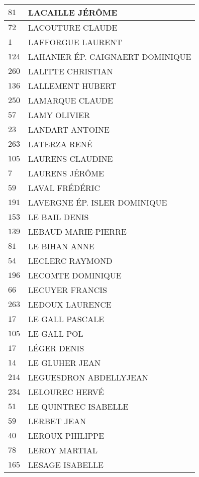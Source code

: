 \begin{xltabular}{\linewidth}{|l|X|}
    \hline
    $81$ & LACAILLE JÉRÔME \\
    \hline
    $72$ & LACOUTURE CLAUDE \\
    \hline
    $1$ & LAFFORGUE LAURENT \\
    \hline
    $124$ & LAHANIER ÉP. CAIGNAERT DOMINIQUE \\
    \hline
    $260$ & LALITTE CHRISTIAN \\
    \hline
    $136$ & LALLEMENT HUBERT \\
    \hline
    $250$ & LAMARQUE CLAUDE \\
    \hline
    $57$ & LAMY OLIVIER \\
    \hline
    $23$ & LANDART ANTOINE \\
    \hline
    $263$ & LATERZA RENÉ \\
    \hline
    $105$ & LAURENS CLAUDINE \\
    \hline
    $7$ & LAURENS JÉRÔME \\
    \hline
    $59$ & LAVAL FRÉDÉRIC \\
    \hline
    $191$ & LAVERGNE ÉP. ISLER DOMINIQUE \\
    \hline
    $153$ & LE BAIL DENIS \\
    \hline
    $139$ & LEBAUD MARIE-PIERRE \\
    \hline
    $81$ & LE BIHAN ANNE \\
    \hline
    $54$ & LECLERC RAYMOND \\
    \hline
    $196$ & LECOMTE DOMINIQUE \\
    \hline
    $66$ & LECUYER FRANCIS \\
    \hline
    $263$ & LEDOUX LAURENCE \\
    \hline
    $17$ & LE GALL PASCALE \\
    \hline
    $105$ & LE GALL POL \\
    \hline
    $17$ & LÉGER DENIS \\
    \hline
    $14$ & LE GLUHER JEAN \\
    \hline
    $214$ & LEGUESDRON ABDELLYJEAN \\
    \hline
    $234$ & LELOUREC HERVÉ \\
    \hline
    $51$ & LE QUINTREC ISABELLE \\
    \hline
    $59$ & LERBET JEAN \\
    \hline
    $40$ & LEROUX PHILIPPE \\
    \hline
    $78$ & LEROY MARTIAL \\
    \hline
    $165$ & LESAGE ISABELLE \\

\end{xltabular}
